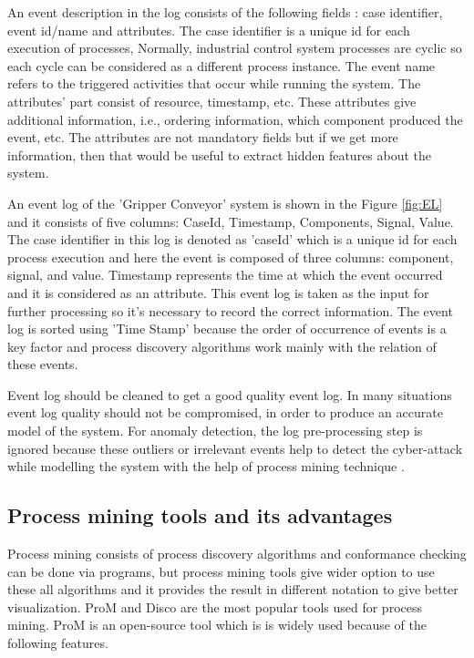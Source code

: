 \begin{bibunit}
	An event description in the log consists of the following fields \cite{paper2}: case identifier, event id/name and attributes. The case identifier is a unique id for each execution of processes, Normally, industrial control system processes are cyclic so each cycle can be considered as a different process instance. The event name refers to the triggered activities that occur while running the system. The attributes’ part consist of resource, timestamp, etc. These attributes give additional information, i.e., ordering information, which component produced the event, etc. The attributes are not mandatory fields but if we get more information, then that would be useful to extract hidden features about the system.
   
	An event log of the 'Gripper Conveyor' system is shown in the Figure \ref{fig:EL} and it consists of five columns: CaseId, Timestamp, Components, Signal, Value. The case identifier in this log is denoted as 'caseId' which is a unique id for each process execution and here the event is composed of three columns: component, signal, and value. Timestamp represents the time at which the event occurred and it is considered as an attribute. This event log is taken as the input for further processing so it's necessary to record the correct information. The event log is sorted using 'Time Stamp' because the order of occurrence of events is a key factor and process discovery algorithms work mainly with the relation of these events.
	
	Event log should be cleaned to get a good quality event log. In many situations event log quality should not be compromised,  in order to produce an accurate model of the system. For anomaly detection, the log pre-processing step is ignored because these outliers or irrelevant events help to detect the cyber-attack while modelling the system with the help of process mining technique \cite{paper2}.
	
   
	\subsection{Process mining tools and its advantages}
   
   Process mining consists of process discovery algorithms and conformance checking can be done via programs, but process mining tools give wider option to use these all algorithms and it provides the result in different notation to give better visualization. ProM \cite{ProM} \cite{van2005prom} and Disco \cite{Disco} \cite{gunther2012disco} are the most popular tools used for process mining. ProM is an open-source tool which is is widely used because of the following features.
   

\end{bibunit}
